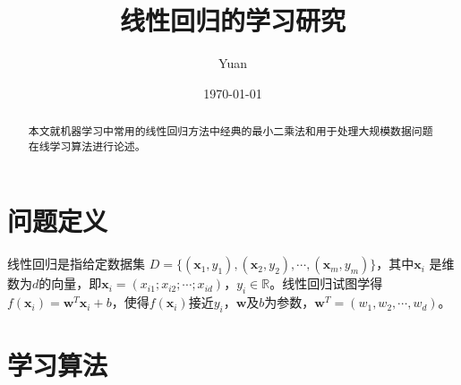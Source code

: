 \documentclass[12pt,a4paper,draft]{ctexart}
\title{线性回归的学习研究}
\author{Yuan}
\date{\today}
\begin{document}
\maketitle
\begin{abstract}
本文就机器学习中常用的线性回归方法中经典的最小二乘法和用于处理大规模数据问题在线学习算法进行论述。
\end{abstract}	
\section{问题定义}
线性回归是指给定数据集 $ D=\{(\mathbf{x}_{1},y_{1}),(\mathbf{x}_{2},y_{2}),\cdots,(\mathbf{x}_{m},y_{m})\} $，其中$\mathbf{x}_i$ 是维数为$ d $的向量，即$\mathbf{x}_i=(x_{i1};x_{i2};\cdots;x_{id})$，$y_{i}\in\mathbb{R} $。线性回归试图学得$f(\mathbf{x}_{i})=\mathbf{w}^T\mathbf{x}_{i}+b$，使得$f(\mathbf{x}_{i})$接近$ y_{i}$，$\mathbf{w}$及$b$为参数，$\mathbf{w}^T=(w_1,w_2,\cdots,w_d)$。
\section{学习算法}
\end{document}

